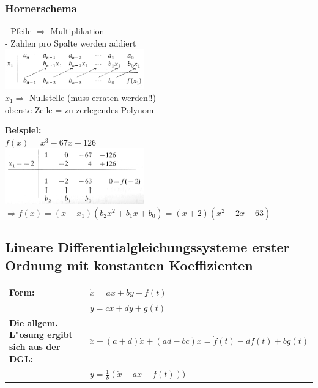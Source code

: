 \subsubsection{Hornerschema}
\begin{minipage}[t]{9cm}
- Pfeile $\Rightarrow$ Multiplikation\\
- Zahlen pro Spalte werden addiert\\
\includegraphics[width=6cm]{./bilder/Hornerschema_1.png}\\
$x_1 \Rightarrow$ Nullstelle (muss erraten werden!!)\\
oberste Zeile = zu zerlegendes Polynom
\end{minipage}
\begin{minipage}[t]{9cm}
\textbf{Beispiel:}\\
$f(x) = x^3-67x-126$\\
\includegraphics[width=6cm]{./bilder/Hornerschema_2.png}\\
$\Rightarrow f(x) = (x-x_1)(b_2x^2 + b_1x + b_0) = (x+2)(x^2-2x-63)$  
\end{minipage}

\subsection{Lineare Differentialgleichungssysteme erster Ordnung mit konstanten
Koeffizienten}
\begin{tabular}{p{8cm}p{8cm}}
\textbf{Form:}&
$\dot{x}=ax+by+f(t)$\\
&
$\dot{y}=cx+dy+g(t)$\\
\textbf{Die allgem. L"osung ergibt sich aus der DGL:}&
$\ddot{x}-(a+d)\dot{x}+(ad-bc)x=\dot{f}(t)-df(t)+bg(t)$\\
&
$y=\frac{1}{b}(\dot{x}-ax-f(t)))$\\
\end{tabular}
